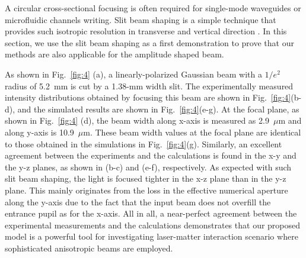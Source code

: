 \documentclass[9pt,twocolumn,twoside]{osajnl}
\begin{document}
A circular cross-sectional focusing is often required for single-mode waveguides or microfluidic channels writing. Slit beam shaping is a simple technique that provides such isotropic resolution in transverse and vertical direction \cite{cheng2003control, ams2005slit}. In this section, we use the slit beam shaping as a first demonstration to prove that our methods are also applicable for the amplitude shaped beam. 

As shown in Fig.~\ref{fig:4} (a), a linearly-polarized Gaussian beam with a $1/e^2$ radius of 5.2~mm is cut by a 1.38-mm width slit. The experimentally measured intensity distributions obtained by focusing this beam are shown in Fig.~\ref{fig:4}(b-d), and the simulated results are shown in Fig.~\ref{fig:4}(e-g). At the focal plane, as shown in Fig.~\ref{fig:4} (d), the beam width along x-axis is measured as 2.9~$\mu$m and along y-axis is 10.9~$\mu$m. These beam width values at the focal plane are identical to those obtained in the simulations in Fig.~\ref{fig:4}(g). Similarly, an excellent agreement between the experiments and the calculations is found in the x-y and the y-z planes, as shown in (b-c) and (e-f), respectively. As expected with such slit beam shaping, the light is focused tighter in the x-z plane than in the y-z plane. This mainly originates from the loss in the effective numerical aperture along the y-axis due to the fact that the input beam does not overfill the entrance pupil as for the x-axis.
All in all, a near-perfect agreement between the experimental measurements and the calculations demonstrates that our proposed model is a powerful tool for investigating laser-matter interaction scenario where sophisticated anisotropic beams are employed. 
\end{document}
